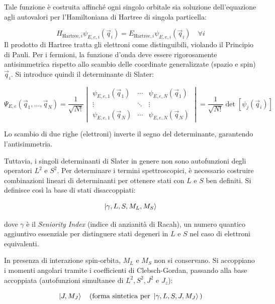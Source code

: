 Tale funzione è costruita affinché ogni singolo orbitale sia soluzione dell'equazione agli autovalori per l'Hamiltoniana di Hartree di singola particella:

\begin{equation}
    H_{\text{Hartree}, i} \psi_{E,e,i}(\vec{q}_i) = E_{\text{Hartree}, i} \psi_{E,e,i}(\vec{q}_i) \quad \forall i
\end{equation}
Il prodotto di Hartree tratta gli elettroni come distinguibili, violando il Principio di Pauli. Per i fermioni, la funzione d'onda deve essere rigorosamente antisimmetrica rispetto allo scambio delle coordinate generalizzate (spazio e spin) \(\vec{q}_i\). Si introduce quindi il determinante di Slater:

\begin{equation}
    \Psi_{E,e}(\vec{q}_1, \dots, \vec{q}_N) = \frac{1}{\sqrt{N!}} \begin{vmatrix}
\psi_{E,e,1}(\vec{q}_1) & \cdots & \psi_{E,e,N}(\vec{q}_1) \\
\vdots & \ddots & \vdots \\
\psi_{E,e,1}(\vec{q}_N) & \cdots & \psi_{E,e,N}(\vec{q}_N)
\end{vmatrix}
=\frac{1}{\sqrt{N!}} \det[\psi_j(\vec{q}_i)]
\end{equation}

Lo scambio di due righe (elettroni) inverte il segno del determinante, garantendo l'antisimmetria.

Tuttavia, i singoli determinanti di Slater in genere non sono autofunzioni degli operatori \(L^2\) e \(S^2\). Per determinare i termini spettroscopici, è necessario costruire combinazioni lineari di determinanti per ottenere stati con \(L\) e \(S\) ben definiti. Si definisce così la base di stati disaccoppiati:

\begin{equation}
    \ket{\gamma, L, S, M_L, M_S}
\end{equation}

dove \(\gamma\) è il \textit{Seniority Index} (indice di anzianità di Racah), un numero quantico aggiuntivo essenziale per distinguere stati degeneri in \(L\) e \(S\) nel caso di elettroni equivalenti.

In presenza di interazione spin-orbita, \(M_L\) e \(M_S\) non si conservano. Si accoppiano i momenti angolari tramite i coefficienti di Clebsch-Gordan, passando alla base accoppiata (autofunzioni simultanee di \(L^2, S^2, J^2\) e \(J_z\)):

\begin{equation}
    \ket{J, M_J} \quad \text{(forma sintetica per } \ket{\gamma, L, S, J, M_J}\text{)}
\end{equation}

